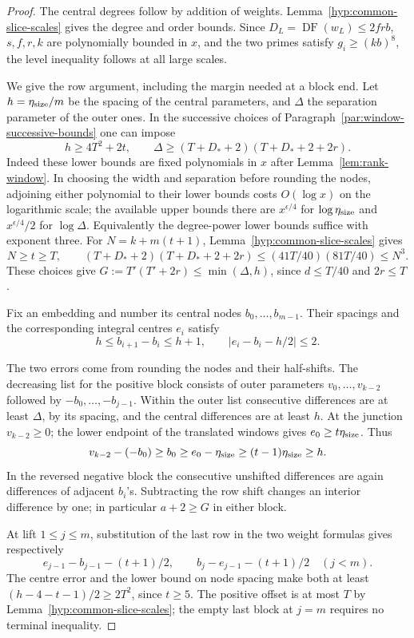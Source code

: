 \begin{proof}
The central degrees follow by addition of weights.
Lemma~\ref{hyp:common-slice-scales} gives the degree and order bounds.
Since \(D_L=\operatorname{DF}(w_L)\le 2frb\), \(s,f,r,k\) are
polynomially bounded in \(x\), and the two primes satisfy
\(g_i\ge(kb)^8\), the level inequality follows at all large scales.

We give the row argument, including the margin needed at a block end.
Let \(h=\eta_{\rm size}/m\) be the spacing of the central parameters,
and \(\Delta\) the separation parameter of the outer ones. In the
successive choices of Paragraph~\ref{par:window-successive-bounds}
one can impose
\[
       h\ge4T^2+2t,\qquad
       \Delta\ge(T+D_*+2)(T+D_*+2+2r).
\]
Indeed these lower bounds are fixed polynomials in \(x\) after
Lemma~\ref{lem:rank-window}. In choosing the width and separation
before rounding the nodes, adjoining either polynomial to their lower
bounds costs \(O(\log x)\) on the logarithmic scale; the available
upper bounds there are \(x^{\epsilon/4}\) for \(\log\eta_{\rm size}\)
and \(x^{\epsilon/4}/2\) for \(\log\Delta\). Equivalently the
degree-power lower bounds suffice with exponent three. For
\(N=k+m(t+1)\), Lemma~\ref{hyp:common-slice-scales} gives
\[
    N\ge t\ge T,\qquad
    (T+D_*+2)(T+D_*+2+2r)\le(41T/40)(81T/40)\le N^3 .
\]
These choices give \(G:=T'(T'+2r)\le\min(\Delta,h)\), since
\(d\le T/40\) and \(2r\le T\).

Fix an embedding and number its central nodes \(b_0,\ldots,b_{m-1}\).
Their spacings and the corresponding integral centres \(e_i\) satisfy
\[
     h\le b_{i+1}-b_i\le h+1,\qquad |e_i-b_i-h/2|\le2 .
\]

The two errors come from rounding the nodes and their half-shifts.
The decreasing list for the positive block consists of outer
parameters \(v_0,\ldots,v_{k-2}\) followed by
\(-b_0,\ldots,-b_{j-1}\). Within the outer list consecutive differences
are at least \(\Delta\), by its spacing, and the central differences
are at least \(h\). At the junction \(v_{k-2}\ge0\); the lower endpoint
of the translated windows gives \(e_0\ge t\eta_{\rm size}\). Thus
\[
   v_{k-2}-(-b_0)\ge b_0\ge e_0-\eta_{\rm size}
                   \ge(t-1)\eta_{\rm size}\ge h .
\] In the reversed negative block the consecutive
unshifted differences are again differences of adjacent \(b_i\)'s.
Subtracting the row shift changes an interior difference by one; in
particular \(a+2\ge G\) in either block.

At lift \(1\le j\le m\), substitution of the last row in the two
weight formulas gives respectively
\[
 e_{j-1}-b_{j-1}-(t+1)/2,\qquad
 b_j-e_{j-1}-(t+1)/2 \quad(j<m).
\]
The centre error and the lower bound on node spacing make both at
least \((h-4-t-1)/2\ge2T^2\), since \(t\ge5\).
The positive offset is at most \(T\) by
Lemma~\ref{hyp:common-slice-scales}; the empty last block at \(j=m\)
requires no terminal inequality.
\end{proof}


